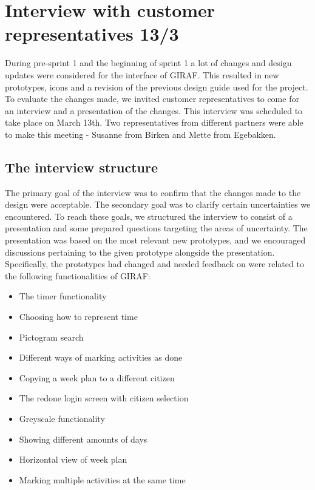 \section{Interview with customer representatives 13/3}\label{interview13/3}
During pre-sprint 1 and the beginning of sprint 1 a lot of changes and design updates were considered for the interface of GIRAF.
This resulted in new prototypes, icons and a revision of the previous design guide used for the project.
To evaluate the changes made, we invited customer representatives to come for an interview and a presentation of the changes.
This interview was scheduled to take place on March 13th.
Two representatives from different partners were able to make this meeting - Susanne from Birken and Mette from Egebakken.

\subsection{The interview structure}
The primary goal of the interview was to confirm that the changes made to the design were acceptable. 
The secondary goal was to clarify certain uncertainties we encountered. 
To reach these goals, we structured the interview to consist of a presentation and some prepared questions targeting the areas of uncertainty.
The presentation was based on the most relevant new prototypes, and we encouraged discussions pertaining to the given prototype alongside the presentation.
Specifically, the prototypes had changed and needed feedback on were related to the following functionalities of GIRAF:
\begin{itemize}
    \item The timer functionality
    \item Choosing how to represent time
    \item Pictogram search
    \item Different ways of marking activities as done
    \item Copying a week plan to a different citizen
    \item The redone login screen with citizen selection
    \item Greyscale functionality
    \item Showing different amounts of days
    \item Horizontal view of week plan
    \item Marking multiple activities at the same time
\end{itemize}

